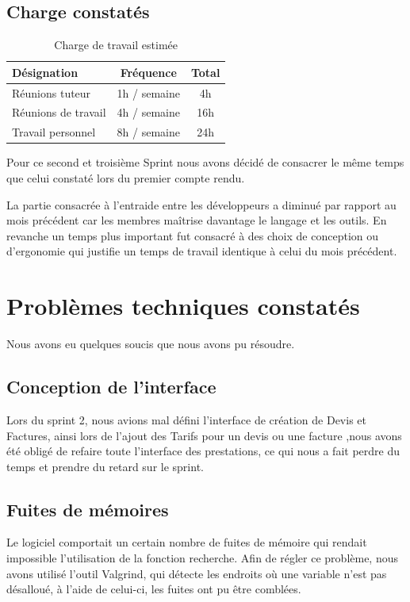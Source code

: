 \documentclass[12pt,a4paper,openany]{article}
\begin{document}
	\subsection{Charge constatés}
	\begin{table}[H]
		\centering
		\begin{tabular}{l|c|c}
			\textbf{Désignation} & \textbf{Fréquence} & \textbf{Total}\\
			\hline
			Réunions tuteur & 1h / semaine & 4h\\
			Réunions de travail & 4h / semaine & 16h\\
			Travail personnel & 8h / semaine & 24h
		\end{tabular}
		\caption{Charge de travail estimée}
	\end{table}
	Pour ce second et troisième Sprint nous avons décidé de consacrer le même temps que celui constaté lors du premier compte rendu. 
	
	La partie consacrée à l'entraide entre les développeurs a diminué par rapport au mois précédent car les membres maîtrise davantage le langage et les outils. En revanche un temps plus important fut consacré à des choix de conception ou d'ergonomie qui justifie un temps de travail identique à celui du mois précédent.

	\section{Problèmes techniques constatés}
	Nous avons eu quelques soucis que nous avons pu résoudre.

	\subsection{Conception de l'interface}
	Lors du sprint 2, nous avions mal défini l'interface de création de Devis et Factures, ainsi lors de l'ajout des Tarifs pour un devis ou une
	facture ,nous avons été obligé de refaire toute l'interface des prestations, ce qui nous a fait perdre du temps et prendre du retard sur le
	sprint.

	\subsection{Fuites de mémoires}
	Le logiciel comportait un certain nombre de fuites de mémoire qui rendait impossible l'utilisation de la fonction recherche. Afin de régler ce
	problème, nous avons utilisé l'outil Valgrind, qui détecte les endroits où une variable n'est pas désalloué, à l'aide de celui-ci, les fuites ont pu
	être comblées.
\end{document}
